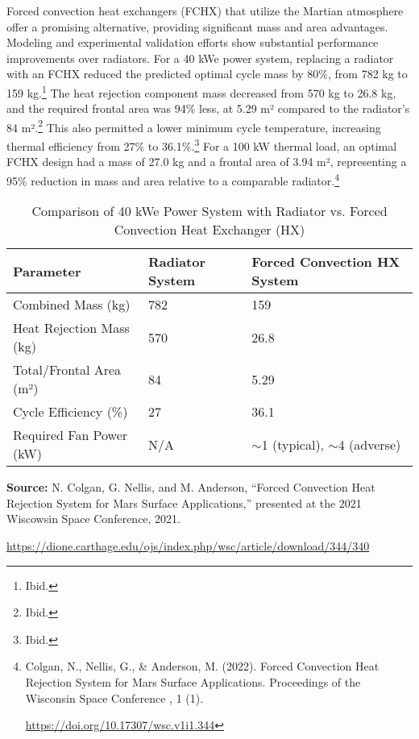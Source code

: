 \documentclass[fontsize=10pt, oneside, DIV=calc]{scrartcl}
\begin{document}
\noindent
Forced convection heat exchangers (FCHX) that utilize the Martian atmosphere offer a promising alternative, providing significant mass and area advantages. Modeling and experimental validation efforts show substantial performance improvements over radiators. For a 40 kWe power system, replacing a radiator with an FCHX reduced the predicted optimal cycle mass by 80\%, from 782 kg to 159 kg.\footnote{Ibid.} The heat rejection component mass decreased from 570 kg to 26.8 kg, and the required frontal area was 94\% less, at 5.29 m² compared to the radiator's 84 m².\footnote{Ibid.} This also permitted a lower minimum cycle temperature, increasing thermal efficiency from 27\% to 36.1\%.\footnote{Ibid.} For a 100 kW thermal load, an optimal FCHX design had a mass of 27.0 kg and a frontal area of 3.94 m², representing a 95\% reduction in mass and area relative to a comparable radiator.\footnote{Colgan, N., Nellis, G., \& Anderson, M. (2022). Forced Convection Heat Rejection System for Mars Surface Applications. Proceedings of the Wisconsin Space Conference , 1 (1). 







\href{https://doi.org/10.17307/wsc.v1i1.344}\url{https://doi.org/10.17307/wsc.v1i1.344}}

\medskip

\noindent
\begin{table}[htbp]
\centering
\caption{Comparison of 40 kWe Power System with Radiator vs. Forced Convection Heat Exchanger (HX)}
\begin{tabularx}{\textwidth}{|X|X|X|}
\hline
\textbf{Parameter} & \textbf{Radiator System} & \textbf{Forced Convection HX System} \\ \hline
Combined Mass (kg) & 782 & 159 \\ \hline
Heat Rejection Mass (kg) & 570 & 26.8 \\ \hline
Total/Frontal Area (m²) & 84 & 5.29 \\ \hline
Cycle Efficiency (\%) & 27 & 36.1 \\ \hline
Required Fan Power (kW) & N/A & $\sim$1 (typical), $\sim$4 (adverse) \\ \hline
\end{tabularx}
\noindent\footnotesize
\textbf{Source:} N. Colgan, G. Nellis, and M. Anderson, ``Forced Convection Heat Rejection System for Mars Surface Applications,'' presented at the 2021 Wiscowsin Space Conference, 2021. 







\href{https://dione.carthage.edu/ojs/index.php/wsc/article/download/344/340}\url{https://dione.carthage.edu/ojs/index.php/wsc/article/download/344/340}
\end{table}
\end{document}

